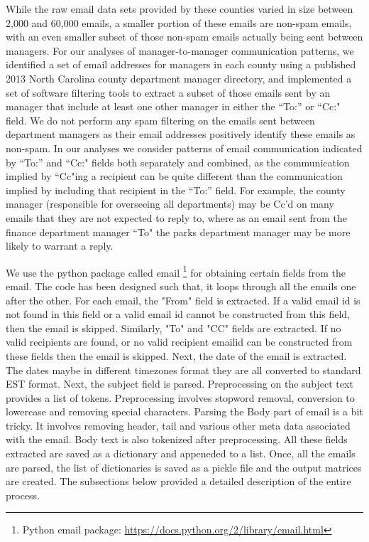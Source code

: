 \documentclass[fleqn]{MJDArticle}
\begin{document}
While the raw email data sets provided by these counties varied in size between 2,000 and 60,000 emails, a smaller portion of these emails are non-spam emails, with an even smaller subset of those non-spam emails actually being sent between managers. For our analyses of manager-to-manager communication patterns, we identified a set of email addresses for managers in each county using a published 2013 North Carolina county department manager directory, and implemented a set of software filtering tools to extract a subset of those emails sent by an manager that include at least one other manager in either the ``To:'' or ``Cc:" field. We do not perform any spam filtering on the emails sent between department managers as their email addresses positively identify these emails as non-spam. In our analyses we consider patterns of email communication indicated by ``To:'' and ``Cc:" fields both separately and combined, as the communication implied by ``Cc"ing a recipient can be quite different than the communication implied by including that recipient in the  ``To:'' field. For example, the county manager (responsible for overseeing all departments) may be Cc'd on many emails that they are not expected to reply to, where as an email sent from the finance department manager ``To" the parks department manager may be more likely to warrant a reply. 
\par
We use the python package called email \footnote{Python email package: \href{https://docs.python.org/2/library/email.html}{https://docs.python.org/2/library/email.html}} for obtaining certain fields from the email. The code has been designed such that, it loops through all the emails one after the other. For each email, the "From" field is extracted. If a valid email id is not found in this field or a valid email id cannot be constructed from this field, then the email is skipped.  Similarly, "To" and "CC" fields are extracted. If no valid recipients are found, or no valid recipient emailid can be constructed from these fields then the email is skipped. Next, the date of the email is extracted. The dates maybe in different timezones format they are all converted to standard EST format. Next, the subject field is parsed. Preprocessing on the subject text provides a list of tokens. Preprocessing involves stopword removal, conversion to lowercase and removing special characters. Parsing the Body part of email is a bit tricky. It involves removing header, tail and various other meta data associated with the email. Body text is also tokenized after preprocessing. All these fields extracted are saved as a dictionary and appeneded to a list. Once, all the emails are parsed, the list of dictionaries is saved as a pickle file and the output matrices are created. The subsections below provided a detailed description of the entire process.
\end{document}
